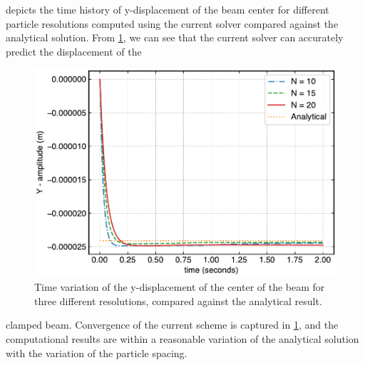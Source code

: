  depicts the time history of y-displacement of the beam
center for different particle resolutions computed using the current solver
compared against the analytical solution. From \cref{fig:udl-disp-plot}, we can
see that the current solver can accurately predict the displacement of the
\begin{figure}
  \centering
  \includegraphics[scale=0.5]{figures/fsi/figures/khayyer_2021_udl/homogenous}
  \caption{Time variation of the y-displacement of the center of the beam for
    three different resolutions, compared against the analytical result.}
\label{fig:udl-disp-plot}
\end{figure}
clamped beam. Convergence of the current scheme is captured in
\cref{fig:udl-disp-plot}, and the computational results are within a reasonable
variation of the analytical solution with the variation of the particle spacing.


